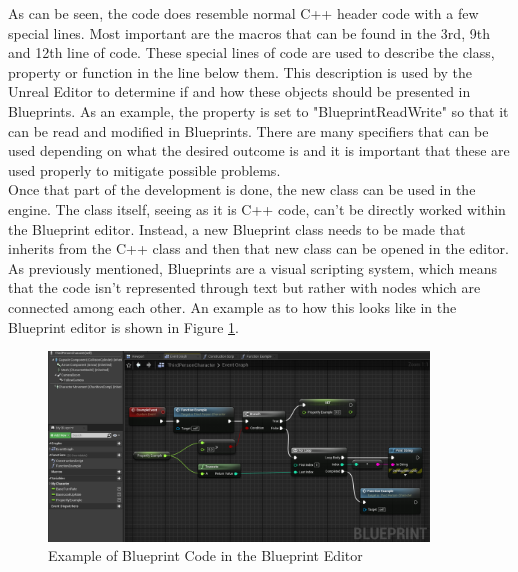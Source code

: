 As can be seen, the code does resemble normal C++ header code with a few special lines. Most important are the macros that can be found in the 3rd, 9th and 12th line of code. These special lines of code are used to describe the class, property or function in the line below them. This description is used by the Unreal Editor to determine if and how these objects should be presented in Blueprints. As an example, the property is set to "BlueprintReadWrite" so that it can be read and modified in Blueprints. There are many specifiers that can be used depending on what the desired outcome is and it is important that these are used properly to mitigate possible problems.\\
 
Once that part of the development is done, the new class can be used in the engine. The class itself, seeing as it is C++ code, can't be directly worked within the Blueprint editor. Instead, a new Blueprint class needs to be made that inherits from the C++ class and then that new class can be opened in the editor.\\
As previously mentioned, Blueprints are a visual scripting system, which means that the code isn't represented through text but rather with nodes which are connected among each other. An example as to how this looks like in the Blueprint editor is shown in Figure \ref{fig:BlueprintExample}.

\begin{figure}[htpb]
	\centering
	\includegraphics[width=0.9\textwidth]{fig/BlueprintExample.png}
	\caption[Example Blueprint Code]{Example of Blueprint Code in the Blueprint Editor\protect}
	\label{fig:BlueprintExample}
\end{figure}

